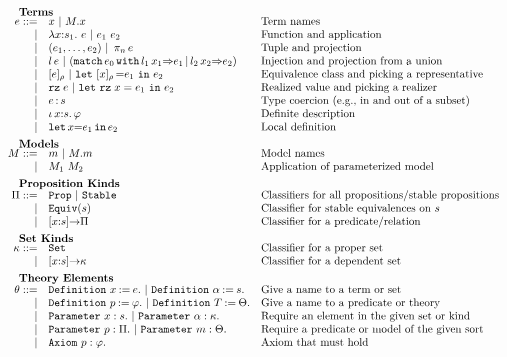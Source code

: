 \begin{figure}
\[\begin{array}{rl@{\quad}l}
		\noalign{\textbf{Terms}}	
		\ie ::=
		    & \ix \ibar \iselect{\im}{\ix} &\mbox{Term names}\\
		  | & \ilambda{\ix}{\is_1}{\ie} \ibar 
		      \iapp{\ie_1}{\ie_2} &\mbox{Function and application}\\
		  | & \ituple{\ie_1}{\ie_2} 
		      \ibar \iproj{\ie}{n}&\mbox{Tuple and projection}\\
		  | & \iinj{\il}{\ie} 
		      \ibar (\imatch{\ie_0}{\il_1}{\ix_1}{\ie_1}{\il_2}{\ix_2}{\ie_2})&\mbox{Injection and projection from a union}\\
		  | & \ieclass{\ie}{\ipp}
		      \ibar \ileteclass{\ix}{\ipp}{\ie_1}{\ie_2}&\mbox{Equivalence class and picking a representative}\\
		  | & \irz{\ie}
		      \ibar \iletrz{\ix}{\ie_1}{\ie_2}&\mbox{Realized value and picking a realizer}\\
		  | & \icoerce{\ie}{\is} &\mbox{Type coercion (e.g., in and out of a subset)}\\
		  | & \ithe{\ix}{\is}{\ip}&\mbox{Definite description}\\
		  | & \ilet{\ix}{\ie_1}{\ie_2}&\mbox{Local definition}\\[5pt]
		
		\noalign{\textbf{Models}}		
		\im ::= 
		    & \iM  \ibar \iselect{\im}{\iM}&\mbox{Model names}\\
		  | & \iapp{\im_1}{\im_2}&\mbox{Application of parameterized model}\\[5pt]
		
		\noalign{\textbf{Proposition Kinds}}
		\ipt ::=
		    & \iProp \ibar \iStable & \mbox{Classifiers for all propositions/stable propositions}\\
		  | & \iEquiv{\is} &\mbox{Classifier for stable equivalences on $\is$}\\
		  | & \idarrow{\ix}{\is}{\ipt} & \mbox{Classifier for a predicate/relation}\\[5pt] 
		
		\noalign{\textbf{Set Kinds}}
		\ik ::= 
		    & \iSet &\mbox{Classifier for a proper set}\\
		   | & \idarrow{\ix}{\is}{\ik} &\mbox{Classifier for a dependent set}\\[5pt]
		

		\noalign{\textbf{Theory Elements}}
		\ite ::=
		     & \iDefinition{\ix}{\ie}.\ibar\iDefinition{\iS}{\is}.&\mbox{Give a name to a term or set}\\
		   | & \iDefinition{\iP}{\ip}.\ibar\iDefinition{\iTH}{\ith}.&\mbox{Give a name to a predicate or theory}\\
		   | & \iParameter{\ix}{\is}.\ibar\iParameter{\iS}{\ik}.&\mbox{Require an element in the given set or kind}\\
		   | & \iParameter{\iP}{\ipt}.\ibar\iParameter{\iM}{\ith}.&\mbox{Require a predicate or model of the given sort}\\
		   | & \iAxiom{\iP}{\ip}.&\mbox{Axiom that must hold}\\[5pt]


\end{array}\]
\end{figure}
